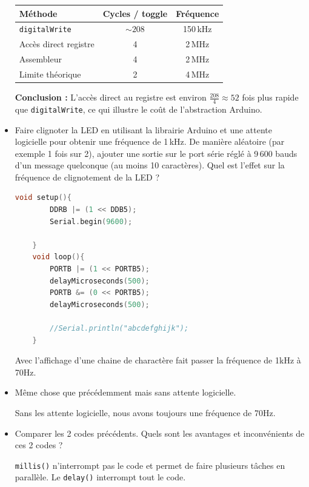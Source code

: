\documentclass[a4paper,11pt]{article}
\begin{document}
\begin{itemize}
\begin{solution}
    \begin{center}
    \begin{tabular}{|l|c|c|}
        \hline
        \textbf{Méthode} & \textbf{Cycles / toggle} & \textbf{Fréquence} \\
        \hline
        \texttt{digitalWrite} & \(\sim 208\) & 150\,kHz \\
        Accès direct registre & 4 & 2\,MHz \\
        Assembleur & 4 & 2\,MHz \\
        Limite théorique & 2 & 4\,MHz \\
        \hline
    \end{tabular}
    \end{center}

    \medskip
    \textbf{Conclusion :} L'accès direct au registre est environ \( \frac{208}{4} \approx 52 \) fois plus rapide que \texttt{digitalWrite}, ce qui illustre le coût de l'abstraction Arduino.
\end{solution}

    \item Faire clignoter la LED en utilisant la librairie Arduino et une attente logicielle pour obtenir une fréquence de 1\,kHz. De manière aléatoire (par exemple 1 fois sur 2), ajouter une sortie sur le port série réglé à 9\,600 bauds d'un message quelconque (au moins 10 caractères). Quel est l'effet sur la fréquence de clignotement de la LED ?
    \begin{solution}
            \begin{lstlisting}[language=C++]
   void setup(){
        DDRB |= (1 << DDB5);
        Serial.begin(9600);
        
    }
    void loop(){
        PORTB |= (1 << PORTB5);
        delayMicroseconds(500);
        PORTB &= (0 << PORTB5);
        delayMicroseconds(500);

        //Serial.println("abcdefghijk");
    }
        \end{lstlisting}
    Avec l'affichage d'une chaine de charactère fait passer la fréquence de 1kHz à 70Hz.
    \end{solution}

    \item Même chose que précédemment mais sans attente logicielle.
    \begin{solution}
        Sans les attente logicielle, nous avons toujours une fréquence de 70Hz.
    \end{solution}

    \item Comparer les 2 codes précédents. Quels sont les avantages et inconvénients de ces 2 codes ?
    \begin{solution}
        \texttt{millis()} n'interrompt pas le code et permet de faire plusieurs tâches en parallèle. Le \texttt{delay()} interrompt tout le code.
    \end{solution}
\end{itemize}
\end{document}
